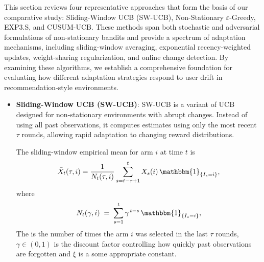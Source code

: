 \documentclass{scrartcl}
\begin{document}
This section reviews four representative approaches that form the basis of our
comparative study: Sliding-Window UCB (SW-UCB), Non-Stationary
$\varepsilon$-Greedy, EXP3.S, and CUSUM-UCB. These methods span both stochastic
and adversarial formulations of non-stationary bandits and provide a spectrum of
adaptation mechanisms, including sliding-window averaging, exponential
recency-weighted updates, weight-sharing regularization, and online change detection.
By examining these algorithms, we establish a comprehensive foundation for evaluating 
how different adaptation strategies respond to user drift in recommendation-style 
environments.

\begin{itemize}


    \item \textbf{Sliding-Window UCB (SW-UCB)}\cite{swucb}:  
    SW-UCB is a variant of UCB designed for non-stationary environments with abrupt changes.  
    Instead of using all past observations, it computes estimates using only the most recent $\tau$ rounds, 
    allowing rapid adaptation to changing reward distributions.  

    The sliding-window empirical mean for arm $i$ at time $t$ is  
    \[
        \bar{X}_t(\tau, i)
        = \frac{1}{N_t(\tau, i)}
        \sum_{s = t-\tau+1}^{t} X_s(i)\,\mathbbm{1}_{\{I_s = i\}},
    \]
    where  
    \[
    N_t(\gamma,i) \;=\; \sum_{s=1}^{t} \gamma^{\,t-s}\,\mathbbm{1}_{\{I_s = i\}},
    \]
 The is the number of times the arm $i$ was selected in the last $\tau$ rounds, $\gamma \in (0,1)$ is the discount factor controlling how quickly past observations are forgotten and $\xi$ is a some appropriate constant.


\end{itemize}
\end{document}
